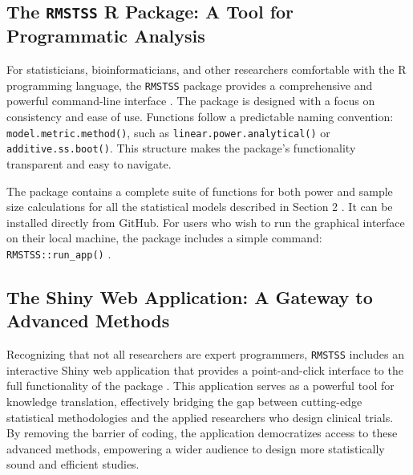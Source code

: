 \documentclass[11pt, a4paper]{article}
\begin{document}
\subsection{The \texttt{RMSTSS} R Package: A Tool for Programmatic Analysis}
For statisticians, bioinformaticians, and other researchers comfortable with the R programming language, the \texttt{RMSTSS} package provides a comprehensive and powerful command-line interface \cite{[1]}. The package is designed with a focus on consistency and ease of use. Functions follow a predictable naming convention: \texttt{model.metric.method()}, such as \texttt{linear.power.analytical()} or \texttt{additive.ss.boot()}. This structure makes the package's functionality transparent and easy to navigate.

The package contains a complete suite of functions for both power and sample size calculations for all the statistical models described in Section 2 \cite{[1]}. It can be installed directly from GitHub. For users who wish to run the graphical interface on their local machine, the package includes a simple command: \texttt{RMSTSS::run\_app()} \cite{[1, 1]}.

\subsection{The Shiny Web Application: A Gateway to Advanced Methods}
Recognizing that not all researchers are expert programmers, \texttt{RMSTSS} includes an interactive Shiny web application that provides a point-and-click interface to the full functionality of the package \cite{[1]}. This application serves as a powerful tool for knowledge translation, effectively bridging the gap between cutting-edge statistical methodologies and the applied researchers who design clinical trials. By removing the barrier of coding, the application democratizes access to these advanced methods, empowering a wider audience to design more statistically sound and efficient studies.
\end{document}
